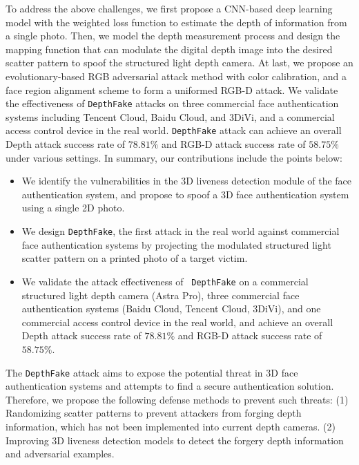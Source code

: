 To address the above challenges, we first propose a CNN-based deep learning model with the weighted loss function to estimate the depth of information from a single photo.
Then, we model the depth measurement process and design the mapping function that can modulate the digital depth image into the desired scatter pattern to spoof the structured light depth camera.
At last, we propose an evolutionary-based RGB adversarial attack method with color calibration, and a face region alignment scheme to form a uniformed RGB-D attack.
We validate the effectiveness of \texttt{DepthFake} attacks on three commercial face authentication systems including Tencent Cloud, Baidu Cloud, and 3DiVi, and a commercial access control device in the real world. \texttt{DepthFake} attack can achieve an overall Depth attack success rate of $78.81\%$ and RGB-D attack success rate of $58.75\%$ under various settings. In summary, our contributions include the points below:
\begin{itemize}	
	\item We identify the vulnerabilities in the 3D liveness detection module of the face authentication system, and propose to spoof a 3D  face authentication system using a single 2D photo.	
	\item We design \texttt{DepthFake},  the first attack in the real world against commercial face authentication systems by projecting the modulated structured light scatter pattern on a printed photo of a target victim.	
	\item We validate the attack effectiveness of  \texttt{DepthFake} on a commercial structured light depth camera (Astra Pro), three commercial face authentication systems (Baidu Cloud, Tencent Cloud, 3DiVi), and one commercial access control device in the real world, and achieve an overall Depth attack success rate of $78.81\%$ and RGB-D attack success rate of $58.75\%$.
\end{itemize}

The \texttt{DepthFake} attack aims to expose the potential threat in 3D face authentication systems and attempts to find a secure authentication solution. Therefore, we propose the following defense methods to prevent such threats:
(1) Randomizing scatter patterns to prevent attackers from forging depth information, which has not been implemented into current depth cameras.
(2) Improving 3D liveness detection models to detect the forgery depth information and adversarial examples.



